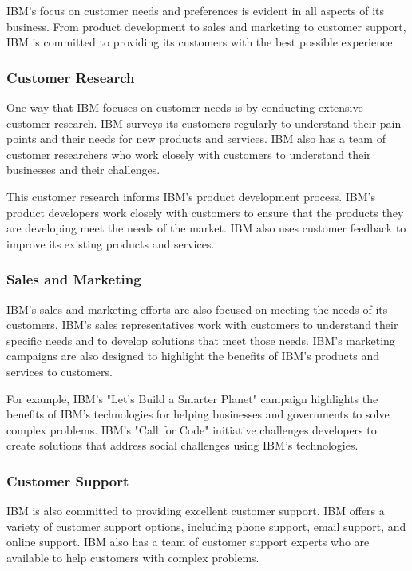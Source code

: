 IBM's focus on customer needs and preferences is evident in all aspects of its business. From product development to sales and marketing to customer support, IBM is committed to providing its customers with the best possible experience.

\subsubsection{Customer Research}

One way that IBM focuses on customer needs is by conducting extensive customer research. IBM surveys its customers regularly to understand their pain points and their needs for new products and services. IBM also has a team of customer researchers who work closely with customers to understand their businesses and their challenges.

This customer research informs IBM's product development process. IBM's product developers work closely with customers to ensure that the products they are developing meet the needs of the market. IBM also uses customer feedback to improve its existing products and services.

\subsubsection{Sales and Marketing}

IBM's sales and marketing efforts are also focused on meeting the needs of its customers. IBM's sales representatives work with customers to understand their specific needs and to develop solutions that meet those needs. IBM's marketing campaigns are also designed to highlight the benefits of IBM's products and services to customers.

For example, IBM's "Let's Build a Smarter Planet" campaign highlights the benefits of IBM's technologies for helping businesses and governments to solve complex problems. IBM's "Call for Code" initiative challenges developers to create solutions that address social challenges using IBM's technologies.

\subsubsection{Customer Support}

IBM is also committed to providing excellent customer support. IBM offers a variety of customer support options, including phone support, email support, and online support. IBM also has a team of customer support experts who are available to help customers with complex problems.

